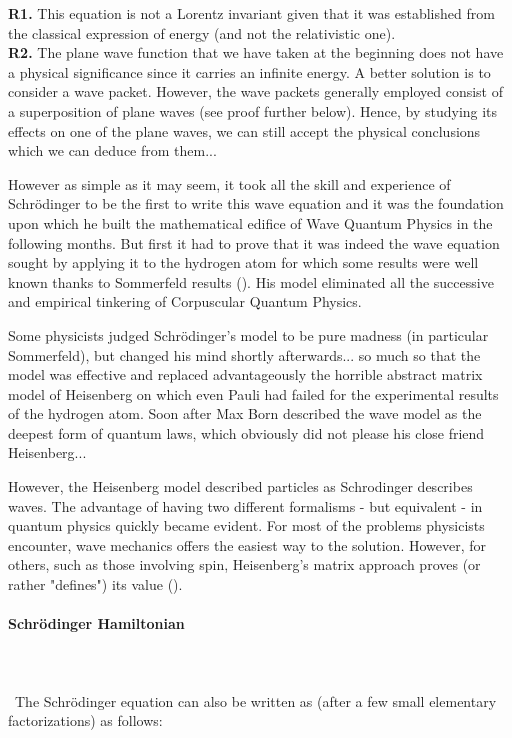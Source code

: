 	\begin{tcolorbox}[title=Remarks,colframe=black,arc=10pt]
	\textbf{R1.} This equation is not a Lorentz invariant given that it was established from the classical expression of energy (and not the relativistic one).\\
	
	\textbf{R2.} The plane wave function that we have taken at the beginning does not have a physical significance since it carries an infinite energy. A better solution is to consider a wave packet. However, the wave packets generally employed consist of a superposition of plane waves (see proof further below). Hence, by studying its effects on one of the plane waves, we can still accept the physical conclusions which we can deduce from them...
	\end{tcolorbox}
	However as simple as it may seem, it took all the skill and experience of Schrödinger to be the first to write this wave equation and it was the foundation upon which he built the mathematical edifice of Wave Quantum Physics in the following months. But first it had to prove that it was indeed the wave equation sought by applying it to the hydrogen atom for which some results were well known thanks to Sommerfeld results (). His model eliminated all the successive and empirical tinkering of Corpuscular Quantum Physics.

	Some physicists judged Schrödinger's model to be pure madness (in particular Sommerfeld), but changed his mind shortly afterwards... so much so that the model was effective and replaced advantageously the horrible abstract matrix model of Heisenberg on which even Pauli had failed for the experimental results of the hydrogen atom. Soon after Max Born described the wave model as the deepest form of quantum laws, which obviously did not please his close friend Heisenberg...
	
	However, the Heisenberg model described particles as Schrodinger describes waves. The advantage of having two different formalisms - but equivalent - in quantum physics quickly became evident. For most of the problems physicists encounter, wave mechanics offers the easiest way to the solution. However, for others, such as those involving spin, Heisenberg's matrix approach proves (or rather "defines") its value ().
	
	\paragraph{Schrödinger Hamiltonian}\label{schrödinger hamiltonian}\mbox{}\\\\\
	The Schrödinger equation can also be written as (after a few small elementary factorizations) as follows:
	
